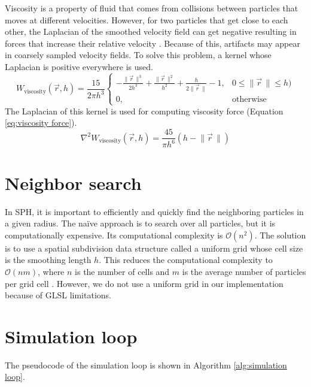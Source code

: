 \documentclass[a4paper, 12pt, oneside]{book}
\begin{document}
\begin{doublespace}
    Viscosity is a property of fluid that comes from collisions between particles that moves at different velocities. However, for two particles that get close to each other, the Laplacian of the smoothed velocity field can get negative resulting in forces that increase their relative velocity \cite{muller2003}. Because of this, artifacts may appear in coarsely sampled velocity fields. To solve this problem, a kernel whose Laplacian is positive everywhere is used.
    \begin{equation}
        W_{\mathrm{viscosity}} (\vec{r}, h) = \frac{15} { 2 \pi h^{3}}
        \begin{cases} 
              -\frac{\lVert\vec{r}\,\rVert^{3}}  {2 h^{3}} + \frac{\lVert\vec{r}\,\rVert^{2}} {h^{2}} + \frac{h} {2 \lVert\vec{r}\,\rVert} - 1, & 0 \leq \lVert\vec{r}\,\rVert \leq h ) \\
            0, & \mathrm{otherwise}
        \end{cases}
    \end{equation}
    The Laplacian of this kernel is used for computing viscosity force (Equation \ref{eq:viscosity force}).
    \begin{equation}
        \nabla^{2} W_{\mathrm{viscosity}} (\vec{r}, h) = \frac{45} {\pi h^{6}} (h - \lVert\vec{r}\,\rVert)
    \end{equation}
    
\end{doublespace}

\section{Neighbor search}
\begin{doublespace}
    In SPH, it is important to efficiently and quickly find the neighboring particles in a given radius. The naïve approach is to search over all particles, but it is computationally expensive. Its computational complexity is \(\mathcal{O}(n^2)\). The solution is to use a spatial subdivision data structure called a uniform grid whose cell size is the smoothing length \(h\). This reduces the computational complexity to \(\mathcal{O}(nm)\), where \(n\) is the number of cells and \(m\) is the average number of particles per grid cell \cite{muller2003}. However, we do not use a uniform grid in our implementation because of GLSL limitations.
\end{doublespace}

\section{Simulation loop}
\begin{doublespace}
    The pseudocode of the simulation loop is shown in Algorithm \ref{alg:simulation loop}.
\end{doublespace}
\end{document}
